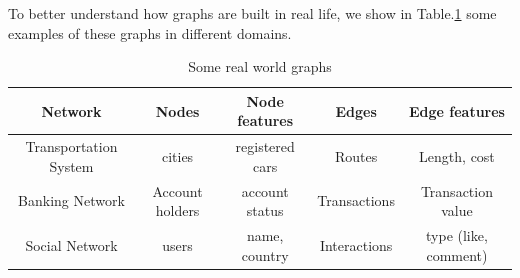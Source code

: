 To better understand how graphs are built in real life, we show in Table.\ref{table:Graph_examples} some examples of these graphs in different domains.

\begin{table}
\small
\begin{center}
\begin{tabular}{|c|c|c|c|c|}
\hline
{Network}  &  {Nodes} & {Node features}  & {Edges}  & {Edge features}  \\
\hline
{Transportation System}  &  {cities} & {registered cars}  & {Routes}  & {Length, cost }  \\
\hline
{Banking Network}  &  {Account holders} & {account status}  & {Transactions}  & {Transaction value}  \\
\hline
{Social Network}  &  {users} & {name, country}  & {Interactions}  & {type (like, comment)}  \\
\hline
\end{tabular}
\end{center}
\caption{Some real world graphs}
\label{table:Graph_examples}
\end{table}

